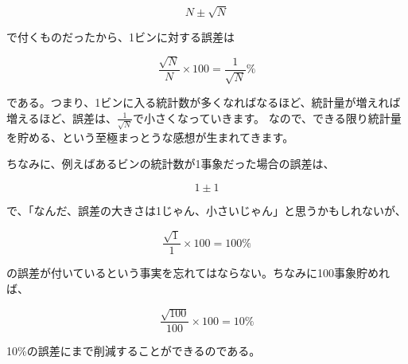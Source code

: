 \begin{equation}
  N\pm\sqrt{N}
\end{equation}

で付くものだったから、1ビンに対する誤差は

\begin{equation}
  \frac{\sqrt{N}}{N}\times 100 = \frac{1}{\sqrt{N}} \%
\end{equation}

である。つまり、1ビンに入る統計数が多くなればなるほど、統計量が増えれば増えるほど、誤差は、$\frac{1}{\sqrt{N}}$で小さくなっていきます。
なので、できる限り統計量を貯める、という至極まっとうな感想が生まれてきます。

ちなみに、例えばあるビンの統計数が1事象だった場合の誤差は、

\begin{equation}
  1\pm 1
\end{equation}

で、「なんだ、誤差の大きさは1じゃん、小さいじゃん」と思うかもしれないが、

\begin{equation}
  \frac{\sqrt{1}}{1}\times 100 = 100 \%
\end{equation}

の誤差が付いているという事実を忘れてはならない。ちなみに100事象貯めれば、

\begin{equation}
  \frac{\sqrt{100}}{100}\times 100 = 10 \%
\end{equation}

10\%の誤差にまで削減することができるのである。


